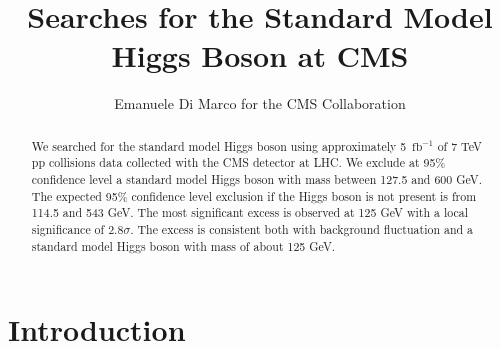 \documentclass{cimento}
\title{Searches for the Standard Model Higgs Boson at CMS}
\author{Emanuele Di Marco for the CMS Collaboration}
\newcommand{\fbinv} {\mbox{\ensuremath{\,\text{fb}^\text{$-$1}}}\xspace}
\begin{document}
\maketitle

\begin{abstract}
We searched for the standard model Higgs boson using approximately
5 \fbinv of 7 TeV pp collisions data collected with the CMS detector
at LHC. We exclude at 95\% confidence level a standard model Higgs
boson with mass between 127.5 and 600 GeV. The expected 95\%
confidence level exclusion if the Higgs boson is not present is from
114.5 and 543 GeV. The most significant excess is observed at 125 GeV
with a local significance of $2.8 \sigma$. The excess is consistent
both with background fluctuation and a standard model Higgs boson with
mass of about 125 GeV.
\end{abstract}

%
%

\section{Introduction}
\end{document}
